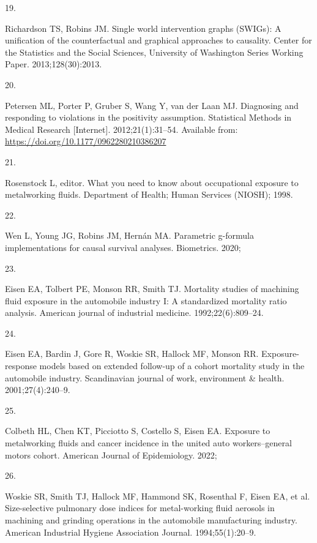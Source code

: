 \documentclass[
  11pt,
  letterpaper,
  DIV=11,
  numbers=noendperiod]{scrartcl}
\newlength{\cslhangindent}
\newlength{\csllabelwidth}
\newenvironment{CSLReferences}[2] %
 {\begin{list}{}{%
  \setlength{\itemindent}{0pt}
  \setlength{\leftmargin}{0pt}
  \setlength{\parsep}{0pt}
  \ifodd #1
   \setlength{\leftmargin}{\cslhangindent}
   \setlength{\itemindent}{-1\cslhangindent}
  \fi
  \setlength{\itemsep}{#2\baselineskip}}}
 {\end{list}}
\newcommand{\CSLLeftMargin}[1]{\parbox[t]{\csllabelwidth}{\strut#1\strut}}
\newcommand{\CSLRightInline}[1]{\parbox[t]{\linewidth - \csllabelwidth}{\strut#1\strut}}
\begin{document}
\begin{CSLReferences}{1}{0}
\CSLLeftMargin{19. }%
\CSLRightInline{Richardson TS, Robins JM. Single world intervention
graphs (SWIGs): A unification of the counterfactual and graphical
approaches to causality. Center for the Statistics and the Social
Sciences, University of Washington Series Working Paper.
2013;128(30):2013. }

\CSLLeftMargin{20. }%
\CSLRightInline{Petersen ML, Porter P, Gruber S, Wang Y, van der Laan
MJ. Diagnosing and responding to violations in the positivity
assumption. Statistical Methods in Medical Research {[}Internet{]}.
2012;21(1):31--54. Available from:
\url{https://doi.org/10.1177/0962280210386207}}

\CSLLeftMargin{21. }%
\CSLRightInline{Rosenstock L, editor. What you need to know about
occupational exposure to metalworking fluids. Department of Health;
Human Services (NIOSH); 1998. }

\CSLLeftMargin{22. }%
\CSLRightInline{Wen L, Young JG, Robins JM, Hernán MA. Parametric
g-formula implementations for causal survival analyses. Biometrics.
2020; }

\CSLLeftMargin{23. }%
\CSLRightInline{Eisen EA, Tolbert PE, Monson RR, Smith TJ. Mortality
studies of machining fluid exposure in the automobile industry {I}: A
standardized mortality ratio analysis. American journal of industrial
medicine. 1992;22(6):809--24. }

\CSLLeftMargin{24. }%
\CSLRightInline{Eisen EA, Bardin J, Gore R, Woskie SR, Hallock MF,
Monson RR. Exposure-response models based on extended follow-up of a
cohort mortality study in the automobile industry. Scandinavian journal
of work, environment \& health. 2001;27(4):240--9. }

\CSLLeftMargin{25. }%
\CSLRightInline{Colbeth HL, Chen KT, Picciotto S, Costello S, Eisen EA.
Exposure to metalworking fluids and cancer incidence in the united auto
workers--general motors cohort. American Journal of Epidemiology. 2022;
}

\CSLLeftMargin{26. }%
\CSLRightInline{Woskie SR, Smith TJ, Hallock MF, Hammond SK, Rosenthal
F, Eisen EA, et al. Size-selective pulmonary dose indices for
metal-working fluid aerosols in machining and grinding operations in the
automobile manufacturing industry. American Industrial Hygiene
Association Journal. 1994;55(1):20--9. }


\end{CSLReferences}
\end{document}
